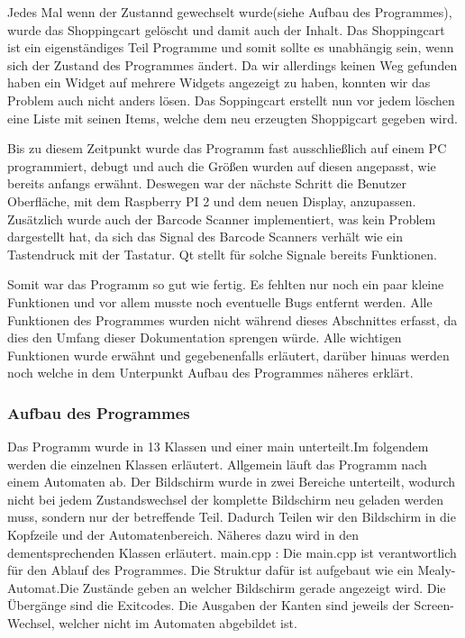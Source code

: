 \documentclass[11pt,a4paper]{article} %
\begin{document}
Jedes Mal wenn der Zustannd gewechselt wurde(siehe Aufbau des Programmes), wurde das Shoppingcart gelöscht und damit auch der Inhalt.
Das Shoppingcart ist ein eigenständiges Teil Programme und somit sollte es unabhängig sein, wenn sich der Zustand des Programmes ändert.
Da wir allerdings keinen Weg gefunden haben ein Widget auf mehrere Widgets angezeigt zu haben, konnten wir das Problem auch nicht anders lösen. Das Soppingcart erstellt nun vor jedem löschen eine Liste mit seinen Items, welche dem neu erzeugten Shoppigcart gegeben wird.
\par
Bis zu diesem Zeitpunkt wurde das Programm fast ausschließlich auf einem PC programmiert, debugt und auch die Größen wurden auf diesen angepasst, wie bereits anfangs erwähnt.
Deswegen war der nächste Schritt die Benutzer Oberfläche, mit dem Raspberry PI 2 und dem neuen Display, anzupassen.
Zusätzlich wurde auch der Barcode Scanner implementiert, was kein Problem dargestellt hat, da sich das Signal des Barcode Scanners verhält wie ein Tastendruck mit der Tastatur. Qt stellt für solche Signale bereits Funktionen.
\par
Somit war das Programm so gut wie fertig. Es fehlten nur noch ein paar kleine Funktionen und vor allem musste noch eventuelle Bugs entfernt werden.
Alle Funktionen des Programmes wurden nicht während dieses Abschnittes erfasst, da dies den Umfang dieser Dokumentation sprengen würde.
Alle wichtigen Funktionen wurde erwähnt und gegebenenfalls erläutert, darüber hinuas werden noch welche in dem Unterpunkt Aufbau des Programmes näheres erklärt.
\par


\subsubsection{Aufbau des Programmes}
Das Programm wurde in 13 Klassen und einer main unterteilt.Im folgendem werden die einzelnen Klassen erläutert.
Allgemein läuft das Programm nach einem Automaten ab. Der Bildschirm wurde in zwei Bereiche unterteilt, wodurch nicht bei jedem Zustandswechsel der komplette Bildschirm neu geladen werden muss, sondern nur der betreffende Teil.
Dadurch Teilen wir den Bildschirm in die Kopfzeile und der Automatenbereich. Näheres dazu wird in den dementsprechenden Klassen erläutert.
main.cpp :
	Die main.cpp ist verantwortlich für den Ablauf des Programmes. Die Struktur dafür ist aufgebaut wie ein Mealy-Automat.Die Zustände geben an welcher Bildschirm gerade angezeigt wird. Die Übergänge sind die Exitcodes.
	Die Ausgaben der Kanten sind jeweils der Screen-Wechsel, welcher nicht im Automaten abgebildet ist.
	
\end{document}

